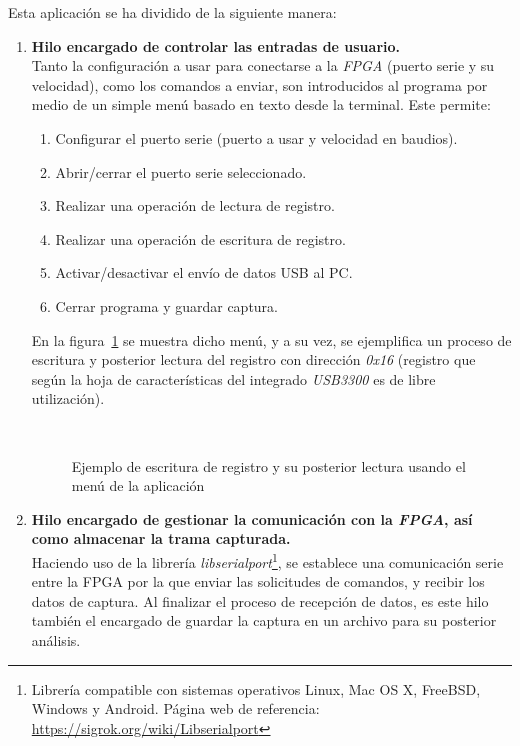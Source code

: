 Esta aplicación se ha dividido de la siguiente manera:
\begin{enumerate}
    \item \textbf{Hilo encargado de controlar las entradas de usuario.} \\
    Tanto la configuración a usar para conectarse a la \emph{FPGA} (puerto serie y su velocidad), como los comandos a enviar, son introducidos al programa por medio de un simple menú basado en texto desde la terminal. Este permite:
    \begin{enumerate}
        \item[Opción 0.] Configurar el puerto serie (puerto a usar y velocidad en baudios).
        \item[Opción 1.] Abrir/cerrar el puerto serie seleccionado.
        \item[Opción 2.] Realizar una operación de lectura de registro.
        \item[Opción 3.] Realizar una operación de escritura de registro.
        \item[Opción 4.] Activar/desactivar el envío de datos USB al PC.
        \item[Opción 5.] Cerrar programa y guardar captura.
    \end{enumerate}

    En la figura~\ref{fig:matriz-app-menu} se muestra dicho menú, y a su vez, se ejemplifica un proceso de escritura y posterior lectura del registro con dirección \emph{0x16} (registro que según la hoja de características del integrado \emph{USB3300}\cite{microchip:usb3300} es de libre utilización).

    \begin{figure}[htbp]
        \centering
         \\
        \caption{Ejemplo de escritura de registro y su posterior lectura usando el menú de la aplicación} 
        \label{fig:matriz-app-menu}
    \end{figure}
    
    \item \textbf{Hilo encargado de gestionar la comunicación con la \emph{FPGA}, así como almacenar la trama capturada.} \\
    Haciendo uso de la librería \emph{libserialport}\footnote{Librería compatible con sistemas operativos Linux, Mac OS X, FreeBSD, Windows y Android. Página web de referencia: \url{https://sigrok.org/wiki/Libserialport}}, se establece una comunicación serie entre la FPGA por la que enviar las solicitudes de comandos, y recibir los datos de captura. Al finalizar el proceso de recepción de datos, es este hilo también el encargado de guardar la captura en un archivo para su posterior análisis.



\end{enumerate}
